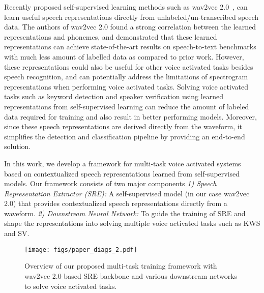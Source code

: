\documentclass{article}
\begin{document}
Recently proposed self-supervised learning methods such as wav2vec 2.0~\cite{wav2vec2}, can learn useful speech representations directly from unlabeled/un-transcribed speech data. 
The authors of wav2vec 2.0 found a strong correlation between the learned representations and phonemes, and demonstrated that these learned representations can achieve state-of-the-art results on speech-to-text benchmarks with much less amount of labelled data as compared to prior work. 
However, these representations could also be useful for other voice activated tasks besides speech recognition, and can potentially address the limitations of spectrogram representations when performing voice activated tasks. Solving voice activated tasks such as keyword detection and speaker verification using learned representations from self-supervised learning can reduce the amount of labeled data required for training and also result in better performing models. Moreover, since these speech representations are derived directly from the waveform, it simplifies the detection and classification pipeline by providing an end-to-end solution.

In this work, we develop a framework for multi-task voice activated systems based on contextualized speech representations learned from self-supervised models. Our framework consists of two major components \textit{1) Speech Representation Extractor (SRE):} A self-supervised model (in our case wav2vec 2.0) that provides contextualized speech representations directly from a waveform.
\textit{2) Downstream Neural Network:} To guide the training of SRE and shape the representations into solving multiple voice activated tasks such as KWS and SV. 

\begin{figure*}[htp]
    \centering
    \texttt{[image: figs/paper\_diags\_2.pdf]}
    \vspace{-8mm}
    \caption{Overview of our proposed multi-task training framework with wav2vec 2.0 based SRE backbone and various downstream networks to solve voice activated tasks.
    }
    \label{fig:model_diagram}
\end{figure*}
\end{document}

